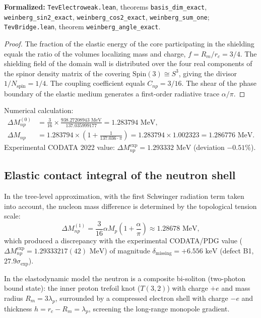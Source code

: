 \documentclass[11pt,a4paper]{article}
\theoremstyle{definition}
\theoremstyle{remark}
\begin{document}
\noindent\small\textbf{Formalized:} \texttt{TevElectroweak.lean}, theorems \texttt{basis_dim_exact}, \texttt{weinberg_sin2_exact}, \texttt{weinberg_cos2_exact}, \texttt{weinberg_sum_one}; \texttt{TevBridge.lean}, theorem \texttt{weinberg_angle_exact}.
\begin{proof}
	The fraction of the elastic energy of the core participating in the shielding equals the ratio of the volumes localizing mass and charge, $f = R_m / r_c = 3/4$. The shielding field of the domain wall is distributed over the four real components of the spinor density matrix of the covering $\mathrm{Spin}(3) \cong S^3$, giving the divisor $1/N_{\mathrm{spin}} = 1/4$. The coupling coefficient equals $C_{np} = 3/16$. The shear of the phase boundary of the elastic medium generates a first-order radiative trace $\alpha/\pi$.
\end{proof}
	
Numerical calculation:
\begin{align}
\Delta M_{np}^{(0)} &= \frac{3}{16} \times \frac{938.27208943\text{ MeV}}{137.035999177} = 1.283794\text{ MeV}, \\
\Delta M_{np} &= 1.283794 \times \left(1 + \frac{1}{137.036 \cdot \pi}\right) = 1.283794 \times 1.002323 = 1.286776\text{ MeV}.
\end{align}
Experimental CODATA 2022 value: $\Delta M_{np}^{\mathrm{exp}} = 1.293332\text{ MeV}$ (deviation $-0.51\%$).

\subsection{Elastic contact integral of the neutron shell}
\label{subsec:b1_contact_resolution}
In the tree-level approximation, with the first Schwinger radiation term taken into account, the nucleon mass difference is determined by the topological tension scale:
\begin{equation}
\Delta M_{np}^{(1)} = \frac{3}{16} \alpha M_p \left(1 + \frac{\alpha}{\pi}\right) \approx 1.28678 \text{ MeV},
\end{equation}
which produced a discrepancy with the experimental CODATA/PDG value ($\Delta M_{np}^{\mathrm{exp}} = 1.29333217(42)\text{ MeV}$) of magnitude $\delta_{\mathrm{missing}} = +6.556\text{ keV}$ (defect B1, $27.9\sigma_{\mathrm{exp}}$).

In the elastodynamic model the neutron is a composite bi-soliton (two-photon bound state): the inner proton trefoil knot ($T(3,2)$) with charge $+e$ and mass radius $R_m = 3\lambda_p$, surrounded by a compressed electron shell with charge $-e$ and thickness $h = r_c - R_m = \lambda_p$, screening the long-range monopole gradient.
\end{document}
